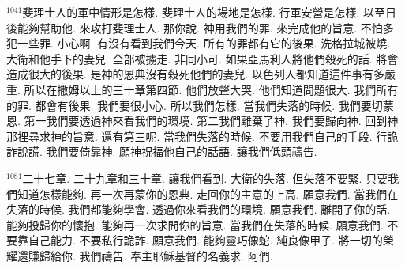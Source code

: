 \documentclass{book}
\begin{document}
$^{1041}$斐理士人的軍中情形是怎樣.
斐理士人的場地是怎樣.
行軍安營是怎樣.
以至日後能夠幫助他.
來攻打斐理士人.
那你說.
神用我們的罪.
來完成他的旨意.
不怕多犯一些罪.
小心啊.
有沒有看到我們今天.
所有的罪都有它的後果.
洗格拉城被燒.
大衛和他手下的妻兒.
全部被擄走.
非同小可.
如果亞馬利人將他們殺死的話.
將會造成很大的後果.
是神的恩典沒有殺死他們的妻兒.
以色列人都知道這件事有多嚴重.
所以在撒姆以上的三十章第四節.
他們放聲大哭.
他們知道問題很大.
我們所有的罪.
都會有後果.
我們要很小心.
所以我們怎樣.
當我們失落的時候.
我們要切蒙恩.
第一我們要透過神來看我們的環境.
第二我們離棄了神.
我們要歸向神.
回到神那裡尋求神的旨意.
還有第三呢.
當我們失落的時候.
不要用我們自己的手段.
行詭詐說謊.
我們要倚靠神.
願神祝福他自己的話語.
讓我們低頭禱告.

$^{1081}$二十七章.
二十九章和三十章.
讓我們看到.
大衛的失落.
但失落不要緊.
只要我們知道怎樣能夠.
再一次再蒙你的恩典.
走回你的主意的上高.
願意我們.
當我們在失落的時候.
我們都能夠學會.
透過你來看我們的環境.
願意我們.
離開了你的話.
能夠投歸你的懷抱.
能夠再一次求問你的旨意.
當我們在失落的時候.
願意我們.
不要靠自己能力.
不要私行詭詐.
願意我們.
能夠靈巧像蛇.
純良像甲子.
將一切的榮耀還賺歸給你.
我們禱告.
奉主耶穌基督的名義求.
阿們.
\newpage
\end{document}
